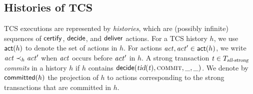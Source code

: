 \subsection{Histories of TCS} \label{ss:histories}

TCS executions are represented by \emph{histories},
which are (possibly infinite) sequences
of ${\sf certify}$, ${\sf decide}$, and ${\sf deliver}$ actions.
For a TCS history $h$, we use ${\sf act}(h)$ to denote the set of actions in $h$.
For actions $\mathit{act}, \mathit{act}' \in {\sf act}(h)$,
we write $\mathit{act} \prec_{h} \mathit{act}'$
when $\mathit{act}$ occurs before $\mathit{act}'$ in $h$.
A strong transaction $\mathit{t} \in T_{\textsl{all-strong}}$ \emph{commits} in a history $h$
if $h$ contains ${\sf decide}(\textsl{tid}(\mathit{t}), \textsc{commit}, \_, \_)$.
We denote by ${\sf committed}(h)$ the projection of $h$ to actions
corresponding to the strong transactions that are committed in $h$.

